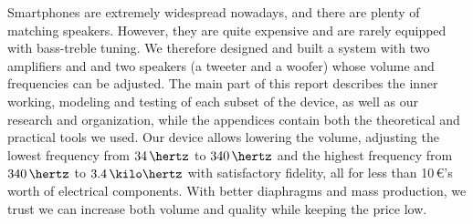 \biabstract
{
%
%
    Smartphones are extremely widespread nowadays,
    and there are plenty of matching speakers.
    However, they are quite expensive and are rarely
    equipped with bass-treble tuning.
    We therefore designed and built a system with
    two amplifiers and and two speakers (a tweeter and a woofer)
    whose volume and frequencies can be adjusted.
    The main part of this report describes the inner working,
    modeling and testing of each subset of the device,
    as well as our research and organization, while
    the appendices contain both the theoretical and practical
    tools we used.
    Our device allows lowering the volume,
    adjusting the lowest frequency from $34\,\hertz$ to $340\,\hertz$ and
    the highest frequency from $340\,\hertz$ to $3.4\,\kilo\hertz$
    with satisfactory fidelity, all for less than 10\,\euro{}'s
    worth of electrical components.
    With better diaphragms and mass production, we trust we can
    increase both volume and quality while keeping
    the price low.
    \newline
}

